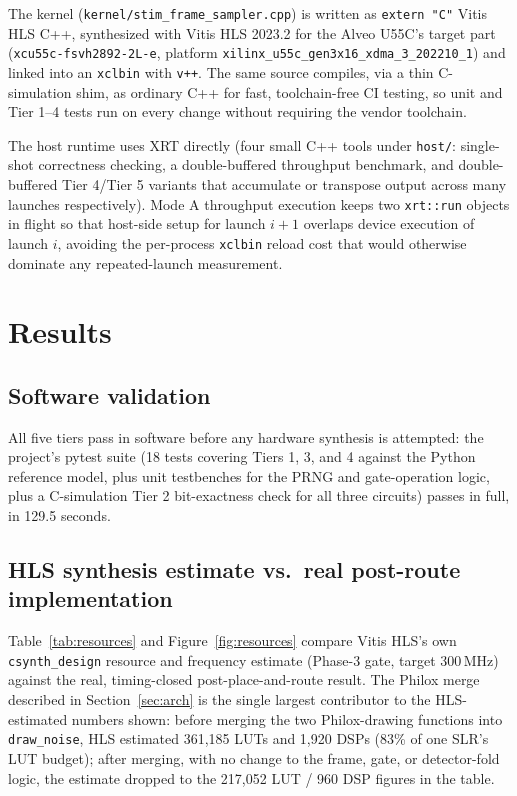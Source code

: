 \documentclass[pdflatex,sn-basic]{sn-jnl}
\begin{document}
The kernel (\texttt{kernel/stim\_frame\_sampler.cpp}) is written as \texttt{extern "C"} Vitis HLS C++, synthesized with Vitis HLS 2023.2 for the Alveo U55C's target part (\texttt{xcu55c-fsvh2892-2L-e}, platform \texttt{xilinx\_u55c\_gen3x16\_xdma\_3\_202210\_1}) and linked into an \texttt{xclbin} with \texttt{v++}. The same source compiles, via a thin C-simulation shim, as ordinary C++ for fast, toolchain-free CI testing, so unit and Tier 1--4 tests run on every change without requiring the vendor toolchain.

The host runtime uses XRT directly (four small C++ tools under \texttt{host/}: single-shot correctness checking, a double-buffered throughput benchmark, and double-buffered Tier 4/Tier 5 variants that accumulate or transpose output across many launches respectively). Mode A throughput execution keeps two \texttt{xrt::run} objects in flight so that host-side setup for launch $i{+}1$ overlaps device execution of launch $i$, avoiding the per-process \texttt{xclbin} reload cost that would otherwise dominate any repeated-launch measurement.

\section{Results}\label{sec:results}

\subsection{Software validation}

All five tiers pass in software before any hardware synthesis is attempted: the project's pytest suite (18 tests covering Tiers 1, 3, and 4 against the Python reference model, plus unit testbenches for the PRNG and gate-operation logic, plus a C-simulation Tier 2 bit-exactness check for all three circuits) passes in full, in 129.5 seconds.

\subsection{HLS synthesis estimate vs.\ real post-route implementation}

Table~\ref{tab:resources} and Figure~\ref{fig:resources} compare Vitis HLS's own \texttt{csynth\_design} resource and frequency estimate (Phase-3 gate, target 300\,MHz) against the real, timing-closed post-place-and-route result. The Philox merge described in Section~\ref{sec:arch} is the single largest contributor to the HLS-estimated numbers shown: before merging the two Philox-drawing functions into \texttt{draw\_noise}, HLS estimated 361{,}185 LUTs and 1{,}920 DSPs (83\% of one SLR's LUT budget); after merging, with no change to the frame, gate, or detector-fold logic, the estimate dropped to the 217{,}052 LUT / 960 DSP figures in the table.
\end{document}
